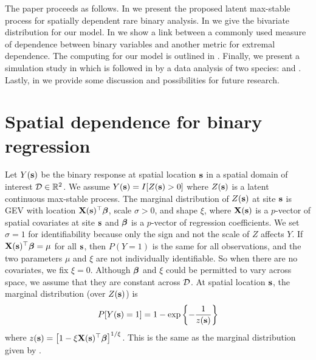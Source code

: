 The paper proceeds as follows.
In  we present the proposed latent max-stable process for spatially dependent rare binary analysis.
In  we give the bivariate distribution for our model.
In  we show a link between a commonly used measure of dependence between binary variables and another metric for extremal dependence.
The computing for our model is outlined in .
Finally, we present a simulation study in  which is followed in  by a data analysis of two species: \tamarix{} and \hedysarum{}.
Lastly, in  we provide some discussion and possibilities for future research.

\section{Spatial dependence for binary regression} \label{rbs:maxstab}

Let $Y(\mathbf{s})$ be the binary response at spatial location $\mathbf{s}$ in a spatial domain of interest ${\cal D} \in \mathbb{R}^2$.
We assume $Y(\mathbf{s}) = I[Z(\mathbf{s}) > 0]$ where $Z(\mathbf{s})$ is a latent continuous max-stable process.
The marginal distribution of $Z(\mathbf{s})$ at site $\mathbf{s}$ is GEV with location $\mathbf{X}(\mathbf{s})^\top \mbox{\boldmath $\beta$}$, scale $\sigma > 0$, and shape $\xi$, where $\mathbf{X}(\mathbf{s})$ is a $p$-vector of spatial covariates at site $\mathbf{s}$ and $\mbox{\boldmath $\beta$}$ is a $p$-vector of regression coefficients.
We set $\sigma = 1$ for identifiability because only the sign and not the scale of $Z$ affects $Y$.
If $\mathbf{X}(\mathbf{s})^\top \mbox{\boldmath $\beta$} = \mu$ for all $\mathbf{s}$, then $P(Y = 1)$ is the same for all observations, and the two parameters $\mu$ and $\xi$ are not individually identifiable.
So when there are no covariates, we fix $\xi = 0$.
Although $\mbox{\boldmath $\beta$}$ and $\xi$ could be permitted to vary across space, we assume that they are constant across ${\cal D}$.
At spatial location $\mathbf{s}$, the marginal distribution (over $Z(\mathbf{s})$) is 
\begin{align}
	P[Y(\mathbf{s}) = 1] = 1 - \exp\left\{ -\displaystyle\frac{ 1 }{ z(\mathbf{s})} \right\}
\end{align} 
where $z(\mathbf{s}) = \left[1 - \xi \mathbf{X}(\mathbf{s})^\top \mbox{\boldmath $\beta$}\right]^{1 / \xi}$.
This is the same as the marginal distribution given by \citet{Wang2010}.

